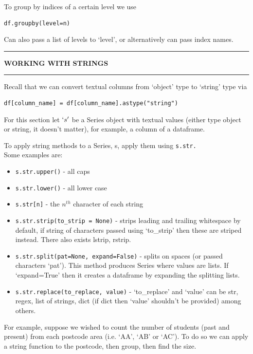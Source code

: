 \documentclass[8pt]{extarticle}
\newcommand{\heading}[1]{%
    \noindent
    \rule{\linewidth}{0.4pt}
    \begin{center}
        \vspace{-1ex}
        \textbf{#1}        
        \vspace{-2.5ex}
    \end{center}
    \rule{\linewidth}{0.4pt}
}
\begin{document}
\begin{multicols}{4}
To group by indices of a certain level we use 

\begin{lstlisting}[style=Python]
df.groupby(level=n)
\end{lstlisting}

Can also pass a list of levels to `level', or alternatively can pass index names.

\columnbreak

\heading{WORKING WITH STRINGS}

Recall that we can convert textual columns from `object' type to `string' type via 

\begin{lstlisting}[style=Python]
df[column_name] = df[column_name].astype("string")
\end{lstlisting}

For this section let $`s'$ be a Series object with textual values (either type object or string, it doesn't matter), for example, a column of a dataframe.

To apply string methods to a Series, s, apply them using \lstinline[style=Python]!s.str.!\\

Some examples are:

\begin{itemize}
    \item \lstinline[style=Python]!s.str.upper()! - all caps 
    \item \lstinline[style=Python]!s.str.lower()! - all lower case
    \item \lstinline[style=Python]!s.str[n]! - the $n^{th}$ character of each string 
    \item \lstinline[style=Python]!s.str.strip(to_strip = None)! - strips leading and trailing whitespace by default, if string of characters passed using `to\_strip' then these are striped instead. There also exists lstrip, rstrip.
    \item \lstinline[style=Python]!s.str.split(pat=None, expand=False)! - splits on spaces (or passed characters `pat'). This method produces Series where values are lists. If `expand=True' then it creates a dataframe by expanding the splitting lists.
    \item \lstinline[style=Python]!s.str.replace(to_replace, value)! - `to\_replace' and `value' can be str, regex, list of strings, dict (if dict then `value' shouldn't be provided) among others.
\end{itemize}

For example, suppose we wished to count the number of students (past and present) from each postcode area (i.e. `AA', `AB' or `AC'). To do so we can apply a string function to the postcode, then group, then find the size. 


\end{multicols}
\end{document}
